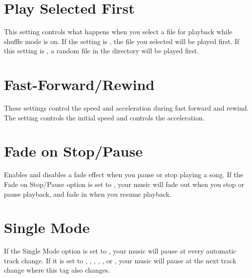 \section{Play Selected First}
  This setting controls what happens when you
  select a file for playback while shuffle mode is on. If the
   setting is , the file you
  selected will be played first. If this setting is , a random
  file in the directory will be played first.

\section{Fast-Forward/Rewind}
  These settings control the speed and acceleration during fast forward and rewind.
  The setting  controls the initial speed and  controls the acceleration.


\section{Fade on Stop/Pause}
  Enables and disables a fade effect when you
  pause or stop playing a song. If the Fade on Stop/Pause option is
  set to , your music will fade out when you stop or pause 
  playback, and fade in when you resume playback.
    
\section{Single Mode}
  If the Single Mode  option is  set to , your music
  will pause at every automatic track change.
  If it is set to , , ,
  , , or ,
  your music will pause at the next track change where this tag also
  changes.

